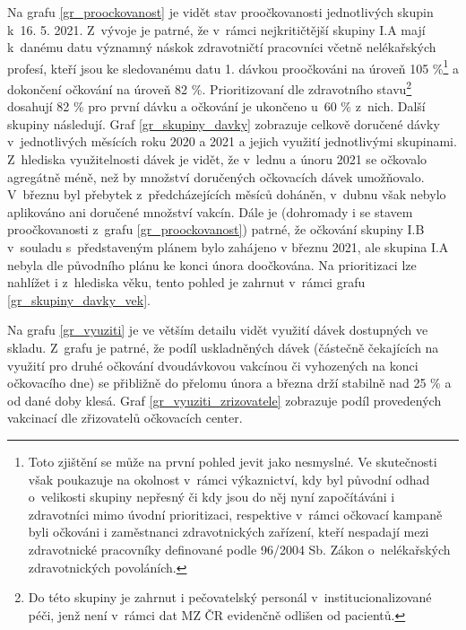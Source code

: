 Na grafu \ref{gr_proockovanost} je vidět stav proočkovanosti jednotlivých skupin k~16. 5. 2021. Z~vývoje je patrné, že v~rámci nejkritičtější skupiny I.A mají k~danému datu vý\-znam\-ný náskok zdravotničtí pracovníci včetně nelékařských profesí, kteří jsou ke sledovanému datu 1. dávkou proočkováni na úroveň 105 \%\footnote{Toto zjištění se může na první pohled jevit jako nesmyslné. Ve skutečnosti však poukazuje na okolnost v~rámci výkaznictví, kdy byl původní odhad o~velikosti skupiny nepřesný či kdy jsou do něj nyní započítáváni i zdravotníci mimo úvodní prioritizaci, respektive v~rámci očkovací kampaně byli očkováni i zaměstnanci zdravotnických zařízení, kteří nespadají mezi zdravotnické pracovníky definované podle 96/2004 Sb. Zákon o~nelékařských zdravotnických povoláních.} a dokončení očkování na úroveň 82 \%. Prioritizovaní dle zdravotního stavu\footnote{Do této skupiny je zahrnut i pečovatelský personál v~institucionalizované péči, jenž není v~rámci dat MZ ČR evidenčně odlišen od pacientů.} dosahují 82 \% pro první dávku a očkování je ukončeno u~60 \% z~nich. Další skupiny následují. 
%
Graf \ref{gr_skupiny_davky} zobrazuje celkově doručené dávky v~jednotlivých měsících roku 2020 a 2021 a jejich využití jednotlivými skupinami. Z~hlediska využitelnosti dávek je vidět, že v~lednu a únoru 2021 se očkovalo agregátně méně, než by množství doručených očkovacích dávek umožňovalo. V~březnu byl přebytek z~předcházejících měsíců doháněn, v~dubnu však nebylo aplikováno ani doručené množství vakcín. Dále je (dohromady i se stavem proočkovanosti z~grafu \ref{gr_proockovanost}) patrné, že očkování skupiny I.B v~souladu s~představeným plánem bylo zahájeno v březnu 2021, ale skupina I.A nebyla dle původního plánu ke konci února doočkována.
%
Na prioritizaci lze nahlížet i z~hlediska věku, tento pohled je zahrnut v~rámci grafu \ref{gr_skupiny_davky_vek}.


Na grafu \ref{gr_vyuziti} je ve větším detailu vidět využití dávek dostupných ve skladu. Z~grafu je patrné, že podíl uskladněných dávek (částečně čekajících na využití pro druhé očkování dvoudávkovou vakcínou či vyhozených na konci očkovacího dne) se přibližně do přelomu února a března drží stabilně nad 25 \% a od dané doby klesá.
%
Graf \ref{gr_vyuziti_zrizovatele} zobrazuje podíl provedených vakcinací dle zřizovatelů očkovacích center.





